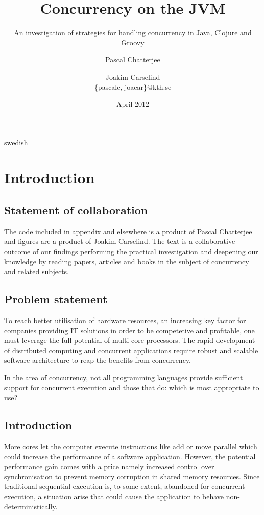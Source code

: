 \documentclass[a4paper,12pt]{kth-mag}
\title{Concurrency on the JVM}
\subtitle{An investigation of strategies for handling concurrency in Java, Clojure and Groovy}
\author{Pascal Chatterjee \and Joakim Carselind \\ \small{\{pascalc, joacar\}@kth.se}}
\date{April 2012}
\begin{document}
\frontmatter
\pagestyle{empty}
\removepagenumbers
\maketitle
{}

\begin{abstract}
    
\end{abstract}

\clearpage

\begin{foreignabstract}{swedish}
  
\end{foreignabstract}

\clearpage

\tableofcontents*
\mainmatter
\pagestyle{newchap}
\makeatletter\@openrightfalse

\chapter{Introduction}

\section{Statement of collaboration}
The code included in appendix and elsewhere is a product of Pascal Chatterjee and figures are a product of Joakim Carselind. The text is a collaborative outcome of our findings performing the practical investigation and deepening our knowledge by reading papers, articles and books in the subject of concurrency and related subjects.

\section{Problem statement}
To reach better utilisation of hardware resources, an increasing key factor for companies providing IT solutions in order to be competetive and profitable, one must leverage the full potential of multi-core processors. The rapid development of distributed computing and concurrent applications require robust and scalable software architecture to reap the benefits from concurrency.

In the area of concurrency, not all programming languages provide sufficient support for concurrent execution and those that do: which is most appropriate to use?

\section{Introduction}
More cores let the computer execute instructions like add or move parallel which could increase the performance of a software application. However, the potential performance gain comes with a price namely increased control over synchronisation to prevent memory corruption in shared memory resources. Since traditional sequential execution is, to some extent, abandoned for concurrent execution, a situation arise that could cause the application to behave non-deterministically.
\end{document}

